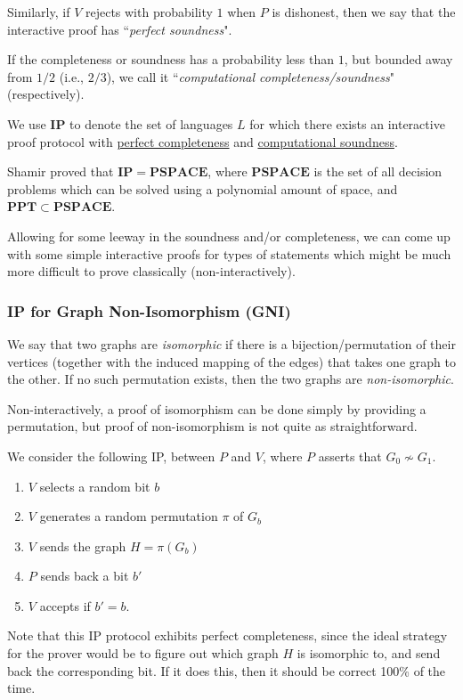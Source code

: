 \documentclass[11pt]{article}
\newcommand{\PPT}{\mathbf{PPT}}
\newcommand{\IP}{\mathbf{IP}}
\newcommand{\PSPACE}{\mathbf{PSPACE}}
\begin{document}
Similarly, if \(V\) rejects with probability \(1\) when \(P\) is dishonest, then we say that the interactive proof has ``\emph{perfect soundness}".\medskip

If the completeness or soundness has a probability less than \(1\), but bounded away from \(1/2\) (i.e., \(2/3\)), we call it ``\emph{computational completeness/soundness}" (respectively).\medskip

We use \(\IP\) to denote the set of languages \(L\) for which there exists an interactive proof protocol with \underline{perfect completeness} and \underline{computational soundness}.\smallskip

 Shamir proved that \(\IP=\PSPACE\), where \(\PSPACE\) is the set of all decision problems which can be solved using a polynomial amount of space, and \(\PPT\subset \PSPACE\).

Allowing for some leeway in the soundness and/or completeness, we can come up with some simple interactive proofs for types of statements which might be much more difficult to prove classically (non-interactively).

\subsubsection{IP for Graph Non-Isomorphism (GNI)}
We say that two graphs are \emph{isomorphic} if there is a bijection/permutation of their vertices (together with the induced mapping of the edges) that takes one graph to the other. If no such permutation exists, then the two graphs are \emph{non-isomorphic}.\smallskip

Non-interactively, a proof of isomorphism can be done simply by providing a permutation, but proof of non-isomorphism is not quite as straightforward.\bigskip

We consider the following IP, between \(P\) and \(V\), where \(P\) asserts that \(G_0\not\sim G_1\).
\begin{enumerate}
\item \(V\) selects a random bit \(b\)
\item \(V\) generates a random permutation \(\pi\) of \(G_b\)
\item \(V\) sends the graph \(H = \pi(G_b)\)
\item \(P\) sends back a bit \(b'\)
\item \(V\) accepts if \(b'=b\).
\end{enumerate}

Note that this IP protocol exhibits perfect completeness, since the ideal strategy for the prover would be to figure out which graph \(H\) is isomorphic to, and send back the corresponding bit. If it does this, then it should be correct 100\% of the time.\smallskip
\end{document}
